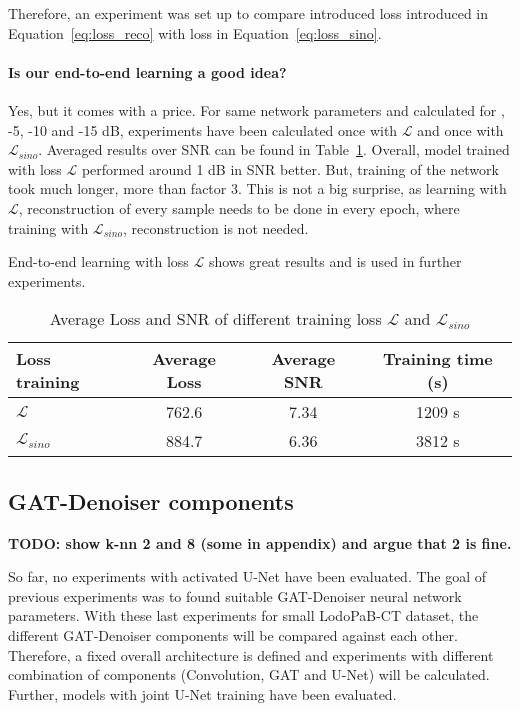 Therefore, an experiment was set up to compare introduced loss introduced in Equation~\ref{eq:loss_reco}
with loss in Equation~\ref{eq:loss_sino}.


\paragraph{Is our end-to-end learning a good idea?}
Yes, but it comes with a price. 
For same network parameters and calculated for , -5, -10 and -15 dB,
experiments have been calculated once with $\mathcal{L} $ and once with $\mathcal{L}_{sino}$.
Averaged results over SNR can be found in Table~\ref{tab:loss_sino_reco}. 
Overall, model trained with loss $\mathcal{L} $ performed around 1 dB in SNR better.
But, training of the network took much longer, more than factor 3. 
This is not a big surprise, as learning with $\mathcal{L} $, reconstruction of every sample
needs to be done in every epoch, where training with $\mathcal{L}_{sino}$, reconstruction is not needed.

End-to-end learning with loss $\mathcal{L} $ shows great results and is used in further experiments.

\begin{table}[H]
  \centering
    \begin{tabular}{l|ccc}
    \toprule
    \textbf{Loss training} & \textbf{Average Loss} & \textbf{Average SNR} & \textbf{Training time (s)}  \\ 
    \midrule
    $\mathcal{L} $         &  762.6    &  7.34  & 1209 s \\ \hline
    $\mathcal{L}_{sino}$   &  884.7    &  6.36  & 3812 s \\ \hline
    \midrule
    \end{tabular}
  \caption{Average Loss and SNR of different training loss $\mathcal{L}$ and $\mathcal{L}_{sino}$}
  \label{tab:loss_sino_reco}
\end{table}


\subsection{GAT-Denoiser components}

\textbf{TODO: show k-nn 2 and 8 (some in appendix) and argue that 2 is fine.}

So far, no experiments with activated U-Net have been evaluated. 
The goal of previous experiments was to found suitable GAT-Denoiser neural network parameters.
With these last experiments for small LodoPaB-CT dataset, the different 
GAT-Denoiser components will be compared against each other.
Therefore, a fixed overall architecture is defined and experiments
with different combination of components (Convolution, GAT and U-Net) will be calculated.
Further, models with joint U-Net training have been evaluated.

